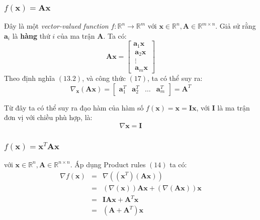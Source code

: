 \documentclass[12pt]{article}
\begin{document}
\subsubsection{$f(\mathbf{x}) = \mathbf{Ax}$}
Đây là một \textit{vector-valued function} $f: \mathbb{R}^n \rightarrow \mathbb{R}^{m} $ với $\mathbf{x} \in \mathbb{R}^n, \mathbf{A} \in \mathbb{R}^{m\times n}$. Giả sử rằng $\mathbf{a}_i$ là \textbf{hàng} thứ $i$ của ma trận $\mathbf{A}$. Ta có:  
\begin{equation*} 
\mathbf{Ax}  =  
\left[ 
\begin{matrix} 
    \mathbf{a}_1\mathbf{x} \\\ 
    \mathbf{a}_2\mathbf{x} \\\ 
    \vdots\\\ 
    \mathbf{a}_m\mathbf{x}  
\end{matrix} 
\right] 
\end{equation*} 
Theo định nghĩa $(13.2)$, và công thức $(17)$, ta có thể suy ra: 
\begin{equation} 
\label{eqn:gdAx}
\nabla_{\mathbf{x}} (\mathbf{Ax}) =  
\left[ 
\begin{matrix} 
    \mathbf{a}_1^T & \mathbf{a}_2^T & \dots & \mathbf{a}_m^T 
\end{matrix} 
\right] = \mathbf{A}^T 
\end{equation} 
 
Từ đây ta có thể suy ra đạo hàm của hàm số $f(\mathbf{x}) = \mathbf{x} = \mathbf{Ix}$, với $\mathbf{I}$ là ma trận đơn vị với chiều phù hợp, là: 
\begin{equation*} 
\nabla \mathbf{x} = \mathbf{I} 
\end{equation*} 
 
\subsubsection{$f(\mathbf{x}) = \mathbf{x}^T\mathbf{A} \mathbf{x}$}
với $\mathbf{x} \in \mathbb{R}^n, \mathbf{A} \in \mathbb{R}^{n\times n}$. Áp dụng Product rules $(14)$ ta có: 
\begin{eqnarray} 
	\nonumber
	\nabla f(\mathbf{x}) &=& \nabla \left(\left(\mathbf{x}^T\right) \left(\mathbf{Ax}\right)\right) \\\ 
				\nonumber
                     &=& \left(\nabla (\mathbf{x})\right) \mathbf{Ax} + \left(\nabla (\mathbf{Ax})\right)\mathbf{x} \\\  
					\nonumber
                     & = & \mathbf{IAx} + \mathbf{A}^T\mathbf{x} \\\ 
                     \label{eqn:gdxTAx}
                     & = & (\mathbf{A} + \mathbf{A}^T)\mathbf{x} 
\end{eqnarray} 
 
\end{document}
